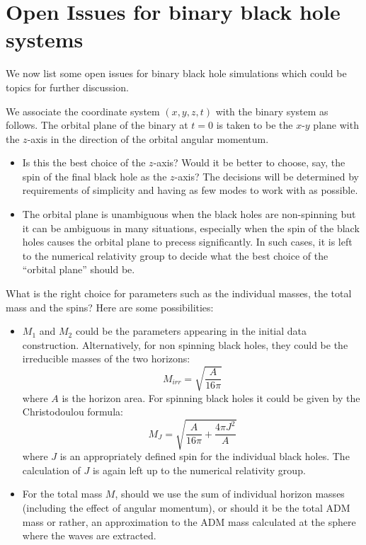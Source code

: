 \documentclass[10pt]{ligodcc}
\begin{document}
\section{Open Issues for binary black hole systems}
\label{sec:openissues}

We now list some open issues for binary black hole simulations which
could be topics for further discussion.

We associate the coordinate system $(x,y,z,t)$ with the binary system
as follows.  The orbital plane of the binary at $t=0$ is taken to be
the $x$-$y$ plane with the $z$-axis in the direction of the orbital
angular momentum.
\begin{itemize}
\item Is this the best choice of the $z$-axis?  Would it be better to
  choose, say, the spin of the final black hole as the $z$-axis? The
  decisions will be determined by requirements of simplicity and
  having as few modes to work with as possible.
\item The orbital plane is unambiguous when the black holes are non-spinning
  but it can be ambiguous in many situations, especially when the spin
  of the black holes causes the orbital plane to precess significantly.
  In such cases, it is left to the numerical relativity group to decide
  what the best choice of the ``orbital plane'' should be. 
\end{itemize}
What is the right choice for parameters such as the individual masses,
the total mass and the spins?  Here are some possibilities:
\begin{itemize}
\item $M_1$ and $M_2$ could be the parameters appearing in the initial
  data construction.  Alternatively, for non spinning black holes,
  they could be the irreducible masses of the two horizons:
  \begin{equation}
    \label{eq:12}
    M_{irr} = \sqrt{\frac{A}{16\pi}}
  \end{equation}
  where $A$ is the horizon area.  For spinning black holes it could be
  given by the Christodoulou formula:
  \begin{equation}
    \label{eq:13}
    M_{J} = \sqrt{\frac{A}{16\pi} + \frac{4\pi J^2}{A}}
  \end{equation}
  where $J$ is an appropriately defined spin for the individual black
  holes.  The calculation of $J$ is again left up to the numerical
  relativity group.
\item For the total mass $M$, should we use the sum of individual
  horizon masses (including the effect of angular momentum), or should
  it be the total ADM mass or rather, an approximation to the ADM mass
  calculated at the sphere where the waves are extracted.
\end{itemize}
\end{document}
